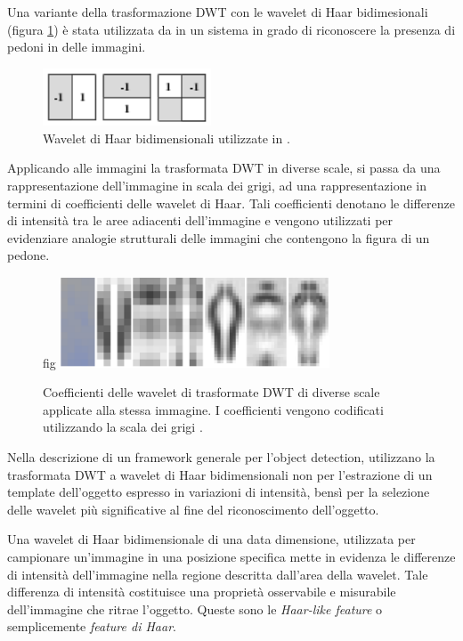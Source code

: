         Una variante della trasformazione DWT con le wavelet di Haar bidimesionali (figura \ref{fig:haar_wavelet}) è stata utilizzata da \citet{Oren97} in un sistema in grado di riconoscere la presenza di pedoni in delle immagini.

        \begin{figure}
            \centering
            \includegraphics[width=5cm]{img/haar_wavelet.png}
            \caption{Wavelet di Haar bidimensionali utilizzate in \cite{Oren97}.}
            \label{fig:haar_wavelet}
        \end{figure}

        Applicando alle immagini la trasformata DWT in diverse scale, si passa da una rappresentazione dell'immagine in scala dei grigi, ad una rappresentazione in termini di coefficienti delle wavelet di Haar.
        Tali coefficienti denotano le differenze di intensità tra le aree adiacenti dell'immagine e vengono utilizzati per evidenziare analogie strutturali delle immagini che contengono la figura di un pedone.

        \begin{figure}fig      \centering
            \includegraphics[width=8cm]{img/pedestrian_dwt.png}
            \caption{Coefficienti delle wavelet di trasformate DWT di diverse scale applicate alla stessa immagine. I coefficienti vengono codificati utilizzando la scala dei grigi \cite[Figura 3]{Oren97}.}
            \label{fig:non_standard_dwt}
        \end{figure}

        Nella descrizione di un framework generale per l'object detection, \citet{Papageorgiou98} utilizzano la trasformata DWT a wavelet di Haar bidimensionali non per l'estrazione di un template dell'oggetto espresso in variazioni di intensità, bensì per la selezione delle wavelet più significative al fine del riconoscimento dell'oggetto.

        Una wavelet di Haar bidimensionale di una data dimensione, utilizzata per campionare un'immagine in una posizione specifica mette in evidenza le differenze di intensità dell'immagine nella regione descritta dall'area della wavelet. Tale differenza di intensità costituisce una proprietà osservabile e misurabile dell'immagine che ritrae l'oggetto. Queste sono le \emph{Haar-like feature} o semplicemente \emph{feature di Haar}.

